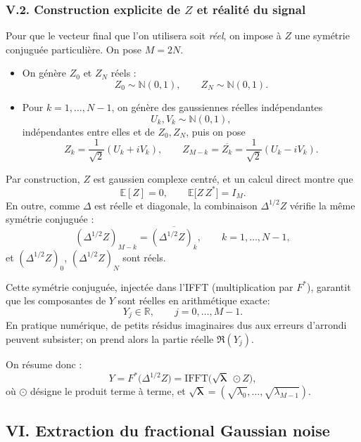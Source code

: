 \documentclass[11pt,a4paper]{article}
\newcommand{\R}{\mathbb{R}}
\newcommand{\N}{\mathbb{N}}
\newcommand{\E}{\mathbb{E}}
\newcommand{\1}{\mathbf{1}}
\begin{document}
\subsubsection*{V.2. Construction explicite de $Z$ et réalité du signal}

Pour que le vecteur final que l'on utilisera soit \emph{réel}, on impose
à $Z$ une symétrie conjuguée particulière. On pose $M=2N$.

\begin{itemize}
  \item On génère $Z_0$ et $Z_N$ réels :
  \[
    Z_0 \sim \N(0,1),\qquad
    Z_N \sim \N(0,1).
  \]
  \item Pour $k=1,\dots,N-1$, on génère des gaussiennes réelles
        indépendantes
        \[
          U_k,V_k \sim \N(0,1),
        \]
        indépendantes entre elles et de $Z_0,Z_N$, puis on pose
        \[
          Z_k = \frac{1}{\sqrt{2}}(U_k + i V_k),
          \qquad
          Z_{M-k} = \overline{Z_k}
          = \frac{1}{\sqrt{2}}(U_k - i V_k).
        \]
\end{itemize}

Par construction, $Z$ est gaussien complexe centré, et un calcul
direct montre que
\[
  \E[Z] = 0,
  \qquad
  \E\bigl[Z\,Z^{\ast}\bigr] = I_M.
\]
En outre, comme $\Delta$ est réelle et diagonale, la combinaison
$\Delta^{1/2}Z$ vérifie la même symétrie conjuguée :
\[
  (\Delta^{1/2}Z)_{M-k}
  = \overline{(\Delta^{1/2}Z)_k},
  \qquad k=1,\dots,N-1,
\]
et $(\Delta^{1/2}Z)_0$, $(\Delta^{1/2}Z)_N$ sont réels.

Cette symétrie conjuguée, injectée dans l'IFFT (multiplication par
$F^{\ast}$), garantit que les composantes de $Y$ sont réelles en
arithmétique exacte:
\begin{equation}
  Y_j \in\R,\qquad j=0,\dots,M-1.
\end{equation}
En pratique numérique, de petits résidus imaginaires dus aux erreurs
d'arrondi peuvent subsister; on prend alors la partie réelle
$\Re(Y_j)$.

On résume donc :
\begin{equation}
  \label{eq:def-Y}
  Y = F^{\ast}\bigl(\Delta^{1/2} Z\bigr)
  = \mathrm{IFFT}\bigl(\sqrt{\bm{\lambda}}\;\odot Z\bigr),
\end{equation}
où $\odot$ désigne le produit terme à terme, et
$\sqrt{\bm{\lambda}}=(\sqrt{\lambda_0},\dots,\sqrt{\lambda_{M-1}})$.

\subsection*{VI. Extraction du fractional Gaussian noise}
\end{document}
